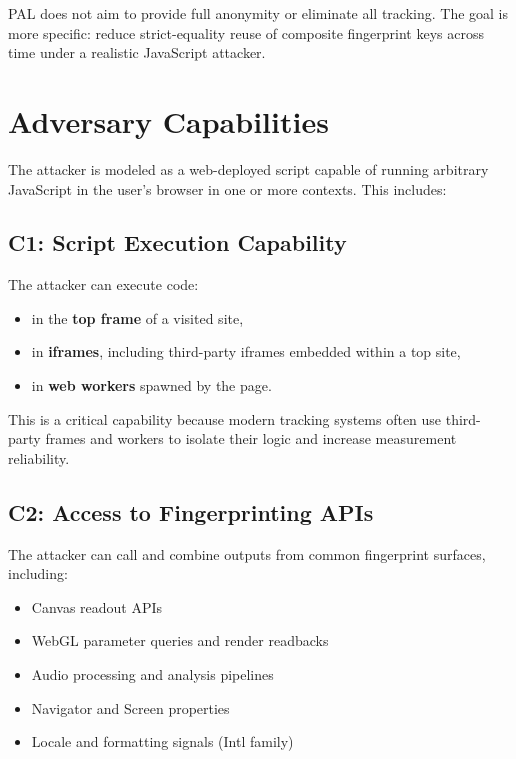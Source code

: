\documentclass[11pt]{report}
\begin{document}
PAL does not aim to provide full anonymity or eliminate all tracking. The goal is more specific: reduce strict-equality reuse of composite fingerprint keys across time under a realistic JavaScript attacker.

\section{Adversary Capabilities}

The attacker is modeled as a web-deployed script capable of running arbitrary JavaScript in the user’s browser in one or more contexts. This includes:

\subsection{C1: Script Execution Capability}

The attacker can execute code:

\begin{itemize}
    \item in the \textbf{top frame} of a visited site,
    \item in \textbf{iframes}, including third-party iframes embedded within a top site,
    \item in \textbf{web workers} spawned by the page.
\end{itemize}

This is a critical capability because modern tracking systems often use third-party frames and workers to isolate their logic and increase measurement reliability.

\subsection{C2: Access to Fingerprinting APIs}

The attacker can call and combine outputs from common fingerprint surfaces, including:

\begin{itemize}
    \item Canvas readout APIs
    \item WebGL parameter queries and render readbacks
    \item Audio processing and analysis pipelines
    \item Navigator and Screen properties
    \item Locale and formatting signals (Intl family)
\end{itemize}
\end{document}
